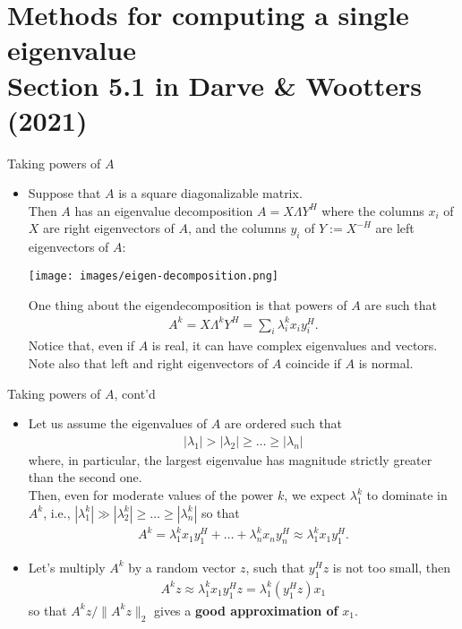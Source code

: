 \documentclass[t,usepdftitle=false]{beamer}
\begin{document}
\section{Methods for computing a single eigenvalue\\{\small Section 5.1 in Darve \& Wootters (2021)}}

\begin{frame}{Taking powers of $A$}
\begin{itemize}
\item Suppose that $A$ is a square diagonalizable matrix.\vspace{.1cm}\\
Then $A$ has an eigenvalue decomposition $A=X\Lambda Y^H$ where the columns $x_i$ of $X$ are right eigenvectors of $A$, and the columns $y_i$ of $Y:=X^{-H}$ are left eigenvectors of $A$:\vspace{.2cm}
\begin{center}
\texttt{[image: images/eigen-decomposition.png]}\vspace{.2cm}
\end{center}
One thing about the eigendecomposition is that powers of $A$ are such that
\begin{align*}
A^k=X\Lambda^k Y^H=\sum_i\lambda^k_ix_iy_i^H.
\end{align*}
Notice that, even if $A$ is real, it can have complex eigenvalues and vectors.\vspace{.1cm}\\
Note also that left and right eigenvectors of $A$ coincide if $A$ is normal.
\end{itemize}
\end{frame}

\begin{frame}{Taking powers of $A$, cont'd}
\begin{itemize}
\item Let us assume the eigenvalues of $A$ are ordered such that 
\begin{align*}
|\lambda_1|>|\lambda_2|\geq\dots\geq |\lambda_n|
\end{align*}
where, in particular, the largest eigenvalue has magnitude strictly greater than the second one.\vspace{.1cm}\\
Then, even for moderate values of the power $k$, we expect $\lambda_1^k$ to dominate in $A^k$, i.e., $|\lambda_1^k|\gg|\lambda_2^k|\geq \dots\geq|\lambda_n^k|$ so that
\begin{align*}
A^k=
\lambda_1^kx_1y_1^H+\dots+\lambda_n^kx_ny_n^H
\approx \lambda_1^kx_1y_1^H.
\end{align*}
\item Let's multiply $A^k$ by a random vector $z$, such that $y_1^Hz$ is not too small, then
\begin{align*}
A^kz\approx \lambda_1^kx_1y_1^Hz=\lambda_1^k(y_1^Hz)x_1
\end{align*}
so that $A^kz/\|A^kz\|_2$ gives a \textbf{good approximation of} $x_1$.
\end{itemize}
\end{frame}
\end{document}
